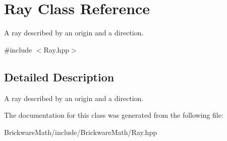 \hypertarget{classRay}{}\section{Ray Class Reference}
\label{classRay}


A ray described by an origin and a direction.  




{\ttfamily \#include $<$Ray.\+hpp$>$}



\subsection{Detailed Description}
A ray described by an origin and a direction. 

The documentation for this class was generated from the following file\+:\begin{DoxyCompactItemize}
\item 
Brickware\+Math/include/\+Brickware\+Math/Ray.\+hpp\end{DoxyCompactItemize}
